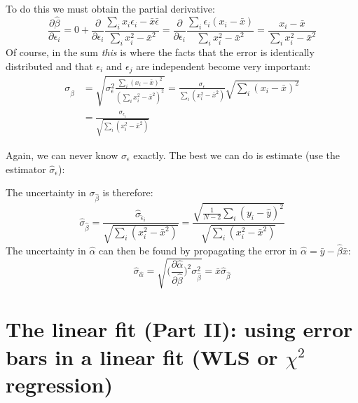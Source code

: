 To do this we must obtain the partial derivative:
\begin{equation}
\frac{\partial \hat \beta}{\partial \epsilon_i} = 0 + \frac{\partial}{\partial \epsilon_i}  \frac{\sum_i x_i \epsilon_i - \bar x \bar \epsilon}{\sum_i   x_i^2 - \bar x^2} = \frac{\partial}{\partial \epsilon_i}  \frac{\sum_i \epsilon_i (x_i - \bar x)}{\sum_i   x_i^2 - \bar x^2} = \frac{x_i - \bar x}{\sum_i   x_i^2 - \bar x^2}
\end{equation}
Of course, in the sum \emph{this} is where the facts that the error is identically distributed and that $\epsilon_i$ and $\epsilon_j$ are independent become very important:
\begin{align}
\sigma_{\hat \beta} &= \sqrt{\sigma_{\epsilon}^2  \frac{ \sum_i (x_i - \bar x)^2}{(\sum_i   x_i^2 - \bar x^2)^2} } = \frac{\sigma_{\epsilon}}{\sum_i  ( x_i^2 - \bar x^2)}\sqrt{ \sum_i (x_i - \bar x)^2}\\
&= \frac{\sigma_{\epsilon_i}}{\sqrt{\sum_i  ( x_i^2 - \bar x^2)}}
\end{align}

Again, we can never know $\sigma_\epsilon$ exactly. The best we can do is estimate (use the estimator $\hat \sigma_\epsilon$):
\begin{framed}
The uncertainty in $\sigma_{\hat \beta}$ is therefore:
\begin{equation}
\hat \sigma_{\hat \beta} = \frac{\hat \sigma_{\hat \epsilon_i}}{\sqrt{\sum_i  ( x_i^2 - \bar x^2)}} = \frac{\sqrt{ \frac{1}{N-2}\sum_i (y_i - \hat y)^2 }}{\sqrt{\sum_i  ( x_i^2 - \bar x^2)}}
\end{equation}
The uncertainty in $\hat \alpha$ can then be found by propagating the error in $\hat \alpha = \bar y - \hat \beta \bar x$:
\begin{equation}
\hat\sigma_{\hat \alpha} = \sqrt{\bigg ( \frac{\partial \hat \alpha}{\partial \hat \beta}\bigg )^2 \sigma_{\hat \beta}^2} = \bar x \hat \sigma_{\hat \beta}
\end{equation}
\end{framed}

\section{The linear fit (Part II): using error bars in a linear fit (WLS or $\chi^2$ regression)}

